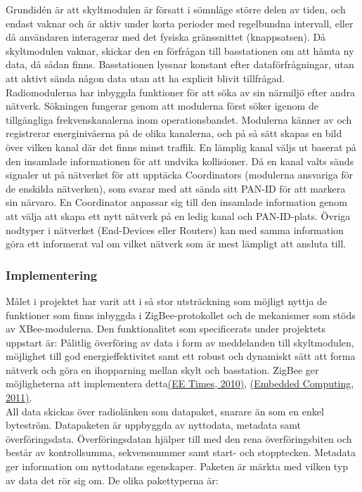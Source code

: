 \documentclass[a4paper,11pt]{article}
\begin{document}
Grundidén är att skyltmodulen är försatt i sömnläge större delen av tiden, och endast vaknar och är aktiv under korta perioder med regelbundna intervall, eller då användaren interagerar med det fysiska gränssnittet (knappsatsen). Då skyltmodulen vaknar, skickar den en förfrågan till basstationen om att hämta ny data, då sådan finns. Basstationen lyssnar konstant efter dataförfrågningar, utan att aktivt sända någon data utan att ha explicit blivit tillfrågad. \\

Radiomodulerna har inbyggda funktioner för att söka av sin närmiljö efter andra nätverk. Sökningen fungerar genom att modulerna först söker igenom de tillgängliga frekvenskanalerna inom operationsbandet. Modulerna känner av och registrerar energinivåerna på de olika kanalerna, och på så sätt skapas en bild över vilken kanal där det finns minst traffik. En lämplig kanal väljs ut baserat på den insamlade informationen för att undvika kollisioner. Då en kanal valts sänds signaler ut på nätverket för att upptäcka Coordinators (modulerna ansvariga för de enskilda nätverken), som svarar med att sända sitt PAN-ID för att markera sin närvaro. En Coordinator anpassar sig till den insamlade information genom att välja att skapa ett nytt nätverk på en ledig kanal och PAN-ID-plats. Övriga nodtyper i nätverket (End-Devices eller Routers) kan med samma information göra ett informerat val om vilket nätverk som är mest lämpligt att ansluta till.

\subsubsection{Implementering}
Målet i projektet har varit att i så stor utsträckning som möjligt nyttja de funktioner som finns inbyggda i ZigBee-protokollet och de mekanismer som stöds av XBee-modulerna.
Den funktionalitet som specificerats under projektets uppstart är: Pålitlig överföring av data i form av meddelanden till skyltmodulen, möjlighet till god energieffektivitet samt ett robust och dynamiskt sätt att forma nätverk och göra en ihopparning mellan skylt och basstation. ZigBee ger möjligheterna att implementera detta\hyperref[eetimes]{(EE Times, 2010)},  \hyperref[embedded]{(Embedded Computing, 2011)}. \\

All data skickas över radiolänken som datapaket, snarare än som en enkel byteström. Datapaketen är uppbyggda av nyttodata, metadata samt överföringsdata. Överföringsdatan hjälper till med den rena överföringsbiten och består av kontrollsumma, sekvensnummer samt start- och stopptecken. Metadata ger information om nyttodatans egenskaper.
Paketen är märkta med vilken typ av data det rör sig om. De olika pakettyperna är:
\end{document}

